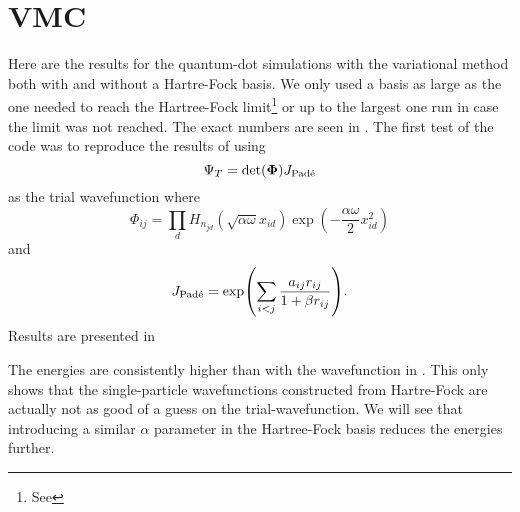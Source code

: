 \section{VMC}
    Here are the results for the quantum-dot simulations with the variational
    method both with and without a Hartre-Fock basis. We only used a basis as
    large as the one needed to reach the Hartree-Fock limit\footnote{See
    } or up to the largest one run in case the limit was not
    reached. The exact numbers are seen in . The
    first test of the code was to reproduce the results of \cite{jorgenThesis,
    hfrefarticle} using
        \begin{equation}
            \Psi_T = \text{det}(\boldsymbol{{\Phi}})J_{\text{Pad\'e}}
            \label{eq:benchtrialwave}
        \end{equation}
    as the trial wavefunction where
        \begin{equation}
            \Phi_{ij} = \prod_d
            H_{n_{jd}}\left(\sqrt{\alpha\omega}x_{id}\right)\exp(-\frac{\alpha\omega}{2}x^2_{id})
        \end{equation}
    and
        \begin{equation}
            J_{\text{Pad\'e}} = \exp(\sum\limits_{i<j} \frac{a_{ij}r_{ij}}{1+\beta
            r_{ij}}).
        \end{equation}
    Results are presented in 
    

    
    The energies are consistently higher than with the wavefunction in
    . This only shows that the single-particle
    wavefunctions constructed from Hartre-Fock are actually not as good of a
    guess on the trial-wavefunction. We will see that introducing a similar
    $\alpha$ parameter in the Hartree-Fock basis reduces the energies further.
